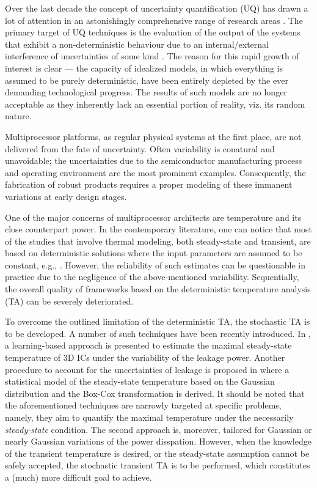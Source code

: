 Over the last decade the concept of uncertainty quantification (UQ) has drawn a lot of attention in an astonishingly comprehensive range of research areas \cite{xiu2009}. The primary target of UQ techniques is the evaluation of the output of the systems that exhibit a non-deterministic behaviour due to an internal/external interference of uncertainties of some kind \cite{eldred2009}. The reason for this rapid growth of interest is clear --- the capacity of idealized models, in which everything is assumed to be purely deterministic, have been entirely depleted by the ever demanding technological progress. The results of such models are no longer acceptable as they inherently lack an essential portion of reality, viz. its random nature.

Multiprocessor platforms, as regular physical systems at the first place, are not delivered from the fate of uncertainty. Often variability is conatural and unavoidable; the uncertainties due to the semiconductor manufacturing process and operating environment are the most prominent examples. Consequently, the fabrication of robust products requires a proper modeling of these immanent variations at early design stages.

One of the major concerns of multiprocessor architects are temperature and its close counterpart power. In the contemporary literature, one can notice that most of the studies that involve thermal modeling, both steady-state and transient, are based on deterministic solutions where the input parameters are assumed to be constant, e.g., \cite{ukhov2012}. However, the reliability of such estimates can be questionable in practice due to the negligence of the above-mentioned variability. Sequentially, the overall quality of frameworks based on the deterministic temperature analysis (TA) can be severely deteriorated.

To overcome the outlined limitation of the deterministic TA, the stochastic TA is to be developed. A number of such techniques have been recently introduced. In \cite{juan2011}, a learning-based approach is presented to estimate the maximal steady-state temperature of 3D ICs under the variability of the leakage power. Another procedure to account for the uncertainties of leakage is proposed in \cite{juan2012} where a statistical model of the steady-state temperature based on the Gaussian distribution and the Box-Cox transformation \cite{box1964} is derived. It should be noted that the aforementioned techniques are narrowly targeted at specific problems, namely, they aim to quantify the maximal temperature under the necessarily \emph{steady-state} condition. The second approach is, moreover, tailored for Gaussian or nearly Gaussian variations of the power disspation. However, when the knowledge of the transient temperature is desired, or the steady-state assumption cannot be safely accepted, the stochastic transient TA is to be performed, which constitutes a (much) more difficult goal to achieve.

